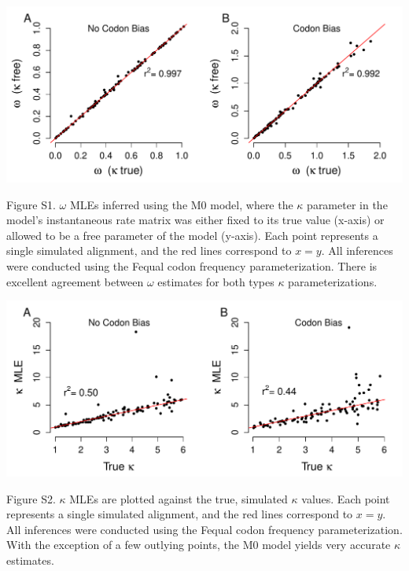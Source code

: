 \documentclass{pnastwo}
\begin{document}
\bigskip
\bigskip
\bigskip
\bigskip

\centerline{\includegraphics[width=5.5in]{figures/SI/omega_kappafree_kappatrue.pdf}}
\noindent Figure S1. $\omega$ MLEs inferred using the M0 model, where the $\kappa$ parameter in the model's instantaneous rate matrix was either fixed to its true value (x-axis) or allowed to be a free parameter of the model (y-axis). Each point represents a single simulated alignment, and the red lines correspond to $x=y$. All inferences were conducted using the Fequal codon frequency parameterization. There is excellent agreement between $\omega$ estimates for both types $\kappa$ parameterizations.

\bigskip
\bigskip
\bigskip
\bigskip


\centerline{\includegraphics[width=5.5in]{figures/SI/kappa_regressions.pdf}}
\noindent Figure S2. $\kappa$ MLEs are plotted against the true, simulated $\kappa$ values. Each point represents a single simulated alignment, and the red lines correspond to $x=y$. All inferences were conducted using the Fequal codon frequency parameterization. With the exception of a few outlying points, the M0 model yields very accurate $\kappa$ estimates. 

\clearpage
\newpage
\end{document}
